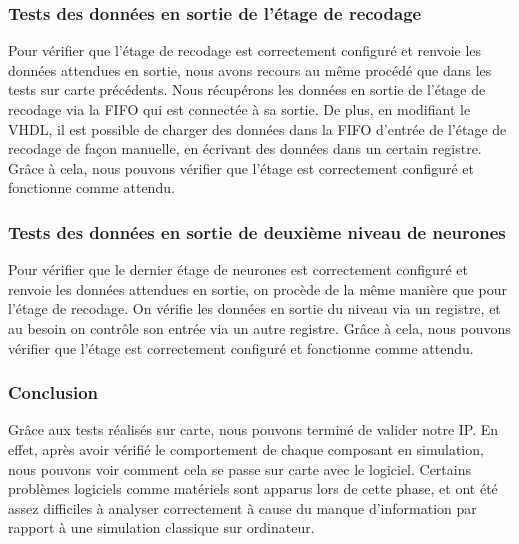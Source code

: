 \subsubsection{Tests des données en sortie de l'étage de recodage}

Pour vérifier que l'étage de recodage est correctement configuré et renvoie les
données attendues en sortie, nous avons recours au même procédé que dans les
tests sur carte précédents. Nous récupérons les données en sortie de l'étage
de recodage via la FIFO qui est connectée à sa sortie.
De plus, en modifiant le VHDL, il est possible de charger des données dans la
FIFO d'entrée de l'étage de recodage de façon manuelle, en écrivant des données
dans un certain registre. Grâce à cela, nous pouvons vérifier que l'étage
est correctement configuré et fonctionne comme attendu.

\subsubsection{Tests des données en sortie de deuxième niveau de neurones}

Pour vérifier que le dernier étage de neurones est correctement configuré et
renvoie les données attendues en sortie, on procède de la même manière que pour
l'étage de recodage.
On vérifie les données en sortie du niveau via un registre, et au besoin on
contrôle son entrée via un autre registre. Grâce à cela, nous pouvons vérifier
que l'étage est correctement configuré et fonctionne comme attendu.


\subsubsection{Conclusion}

Grâce aux tests réalisés sur carte, nous pouvons terminé de valider notre IP.
En effet, après avoir vérifié le comportement de chaque composant en simulation,
nous pouvons voir comment cela se passe sur carte avec le logiciel.
Certains problèmes logiciels comme matériels sont apparus lors de cette phase,
et ont été assez difficiles à analyser correctement à cause du manque
d'information par rapport à une simulation classique sur ordinateur.
